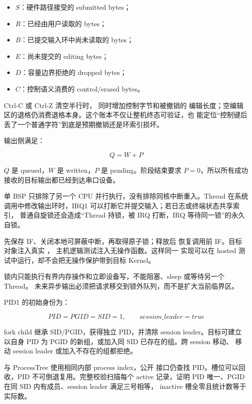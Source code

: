 \begin{itemize}
  \item \(S\)：硬件路径接受的 submitted bytes；
  \item \(R\)：已经由用户读取的 bytes；
  \item \(B\)：已提交输入环中尚未读取的 bytes；
  \item \(E\)：尚未提交的 editing bytes；
  \item \(D\)：容量边界拒绝的 dropped bytes；
  \item \(C\)：控制语义消费的 control/erased bytes。
\end{itemize}

Ctrl-C 或 Ctrl-Z 清空半行时， 同时增加控制字节和被撤销的
编辑长度；空编辑区的退格仍消费退格本身。这个账本不仅让整机终态可验证，也
能定位“控制键后丢了一个普通字符”到底是预期撤销还是环索引损坏。

输出侧满足：

\[
Q=W+P
\]

\(Q\) 是 queued，\(W\) 是 written，\(P\) 是 pending。阶段结束要求
\(P=0\)，所以所有成功接收的目标输出都已经到达串口设备。

单 BSP 只排除了另一个 CPU 并行执行，没有排除同核中断重入。Thread 在系统
调用中修改输出环时，IRQ1 可以打断它并提交输入；若日志或终端状态共享索引，
普通自旋锁还会造成“Thread 持锁，被 IRQ 打断，IRQ 等待同一锁”的永久自锁。

 先保存 IF、关闭本地可屏蔽中断，再取得原子锁；释放后
恢复调用前 IF。目标对象注入真实 ，
主机逻辑测试注入无操作函数。这样同一  实现可以在 hosted
测试中运行，却不会把无操作保护带到目标 Kernel。

\begin{contractbox}
锁内只能执行有界内存操作和立即设备写，不能阻塞、sleep 或等待另一个 Thread。
未来异步输出必须把请求移交到锁外队列，而不是扩大当前临界区。
\end{contractbox}

PID1 的初始身份为：

\[
PID=PGID=SID=1,\qquad session\_leader=true
\]

fork child 继承 SID/PGID，获得独立 PID，并清除 session leader。目标可建立
以自身 PID 为 PGID 的新组，或加入同 SID 已存在的组。跨 session 移动、
移动 session leader 或加入不存在的组都拒绝。

 与 ProcessTree 使用相同内部 process index，公开
接口仍查找 PID。槽位可以回收，PID 不可倒退复用。完整校验扫描每个 active
记录，证明 PID 唯一、PGID 在同 SID 内有成员、session leader 满足三号相等，
inactive 槽全零且统计数等于实际数。

